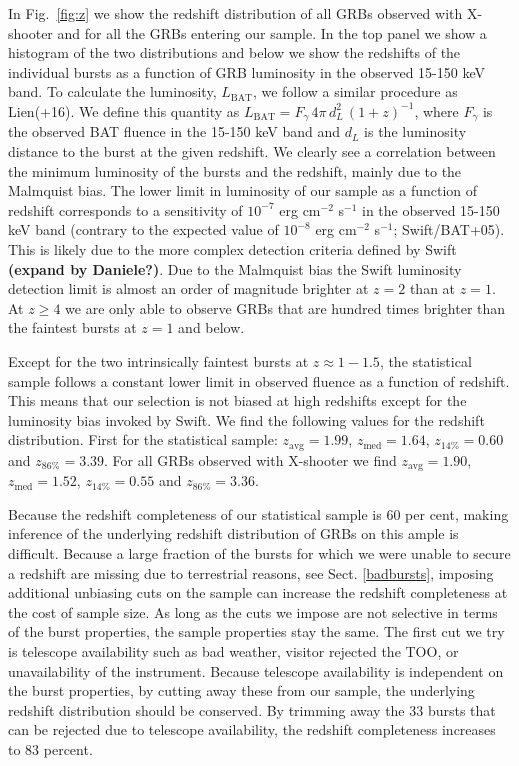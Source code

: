 \documentclass{aa}    %
\begin{document}
In Fig.~\ref{fig:z} we show the redshift distribution of all GRBs observed with
X-shooter and for all the GRBs entering our sample. In the top panel we show a
histogram of the two distributions and below we show the redshifts of the
individual bursts as a function of GRB luminosity in the observed 15-150 keV
band. To calculate the luminosity, $L_{\mathrm{BAT}}$, we follow a similar
procedure as Lien(+16). We define this quantity as $L_{\mathrm{BAT}} =
F_{\gamma}\,4 \pi\,d_L^2\,(1+z)^{-1}$, where $F_{\gamma}$ is the observed BAT
fluence in the 15-150 keV band and $d_L$ is the luminosity distance to the
burst at the given redshift. We clearly see a correlation between the minimum
luminosity of the bursts and the redshift, mainly due to the Malmquist bias.
The lower limit in luminosity of our sample as a function of redshift
corresponds to a sensitivity of $10^{-7}$ erg cm$^{-2}$ s$^{-1}$ in the
observed 15-150 keV band (contrary to the expected value of $10^{-8}$ erg
cm$^{-2}$ s$^{-1}$; Swift/BAT+05). This is likely due to the more complex
detection criteria defined by Swift \textbf{(expand by Daniele?)}. Due to the Malmquist
bias the Swift luminosity detection limit is almost an order of magnitude
brighter at $z=2$ than at $z=1$. At $z\geq4$ we are only able to observe GRBs
that are hundred times brighter than the faintest bursts at $z=1$ and below.

Except for the two intrinsically faintest bursts at $z\approx 1 - 1.5$, the
statistical sample follows a constant lower limit in observed fluence as a
function of redshift. This means that our selection is not biased at high
redshifts except for the luminosity bias invoked by Swift. We find the
following values for the redshift distribution. First for the statistical
sample: $z_{\mathrm{avg}}=1.99$, $z_{\mathrm{med}}=1.64$, $z_{14\%}=0.60$ and
$z_{86\%}=3.39$. For all GRBs observed with X-shooter we find
$z_{\mathrm{avg}}=1.90$, $z_{\mathrm{med}}=1.52$, $z_{14\%}=0.55$ and
$z_{86\%}=3.36$.



Because the redshift completeness of our statistical sample is 60 per cent,
making inference of the underlying redshift distribution of GRBs on this ample
is difficult. Because a large fraction of the bursts for which we were unable to
secure a redshift are missing due to terrestrial reasons, see Sect.
\ref{badbursts}, imposing additional unbiasing cuts on the sample can increase
the redshift completeness at the cost of sample size. As long as the cuts we
impose are not selective in terms of the burst properties, the sample properties
stay the same. The first cut we try is telescope availability such as bad
weather, visitor rejected the TOO, or unavailability of the instrument. Because
telescope availability is independent on the burst properties, by cutting away
these from our sample, the underlying redshift distribution should be conserved.
By trimming away the 33 bursts that can be rejected due to
telescope availability, the redshift completeness increases to 83 percent.
\end{document}
